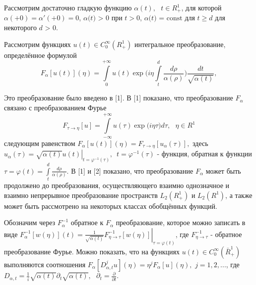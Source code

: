 





\vzmscaption

{\sloppy

Рассмотрим достаточно гладкую функцию $\alpha (t),\,\,\,\,t \in R_ + ^1 $,
для которой $\alpha ( + 0) = {\alpha }'( + 0) = 0$, $\alpha \mbox{(}t\mbox{)
> 0}$ при $t > 0$, $\alpha \mbox{(}t\mbox{) = const}$ для $t \geqslant d$ для
некоторого $d\mbox{ > 0}$.

Рассмотрим функциях $u(t) \in C_0^\infty (R_ + ^1 )$ интегральное
преобразование, определённое формулой
\begin{equation}
\label{eq4400}
F_\alpha [u(t)](\eta ) = \int\limits_0^{ + \infty } {u(t)\exp (i\eta }
\int\limits_t^d {\frac{d\rho }{\alpha (\rho )}} )\frac{dt}{\sqrt {\alpha
(t)} },
\end{equation}

Это преобразование было введено в [1]. В [1] показано, что преобразование
$F_\alpha $ связано с преобразованием Фурье
\[
F_{\tau \to \eta } [u] = \int\limits_{ - \infty }^{ + \infty } {u(\tau )\exp
(i\eta } \tau )d\tau ,\,\,\,\,\eta \in R^1
\]
следующим равенством $F_\alpha [u(t)](\eta ) = F_{\tau \to \eta } [u_\alpha
(\tau )],$ здесь $u_\alpha (\tau ) = \left. {\sqrt {\alpha (t)} u(t)}
\right|_{t = \varphi ^{ - 1}(\tau )} ,\,\,\,t = \varphi ^{ - 1}(\tau )$ -
функция, обратная к функции $\tau = \varphi (t) = \int\limits_t^d
{\frac{d\rho }{\alpha (\rho )}} .$ В [1] и [2] показано, что преобразование
$F_\alpha $ может быть продолжено до преобразования, осуществляющего взаимно
однозначное и взаимно непрерывное преобразование пространств $L_2 (R_ + ^1
)$ и $L_2 (R^1 )$, а также может быть рассмотрено на некоторых классах
обобщённых функций.

Обозначим через $F_\alpha ^{ - 1} $ обратное к $F_\alpha $ преобразование,
которое можно записать в виде $F_\alpha ^{ - 1} [w(\eta )](t) = \left.
{\frac{1}{\sqrt {\alpha (t)} }F_{\eta \to \tau }^{ - 1} [w(\eta )]}
\right|_{\tau = \varphi (t)} $, где $F_{\eta \to \tau }^{ - 1} $ - обратное
преобразование Фурье. Можно показать, что на функциях $u(t) \in C_0^\infty
(\bar {R}_ + ^1 )$ выполняются соотношения $F_\alpha [D_{\alpha ,t}^j
u](\eta ) = \eta ^jF_\alpha [u](\eta ),\,\,j = 1,2,...$, где $D_{\alpha ,t}
= \frac{1}{i}\sqrt {\alpha (t)} \partial _t \sqrt {\alpha (t)}
,\,\,\,\,\partial _t = \frac{\partial }{\partial t}.$

}
